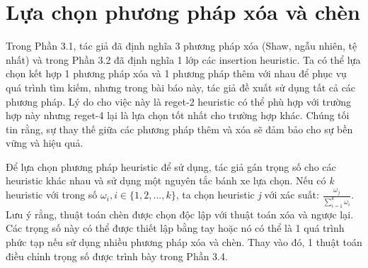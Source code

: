 \section{Lựa chọn phương pháp xóa và chèn}
Trong Phần 3.1, tác giả đã định nghĩa 3 phương pháp xóa (Shaw, ngẫu nhiên, tệ nhất) và trong Phần 3.2 đã định nghĩa 1 lớp các insertion heuristic. Ta có thể lựa chọn kết hợp 1 phương pháp xóa và 1 phương pháp thêm với nhau để phục vụ quá trình tìm kiếm, nhưng trong bài báo này, tác giả đề xuất sử dụng tất cả các phương pháp. Lý do cho việc này là reget-2 heuristic có thể phù hợp với trường hợp này nhưng reget-4 lại là lựa chọn tốt nhất cho trường hợp khác. Chúng tối tin rằng, sự thay thế giữa các phương pháp thêm và xóa sẽ đảm bảo cho sự bền vững và hiệu quả.

Để lựa chọn phương pháp heuristic để sử dụng, tác giả gán trọng số cho các heuristic khác nhau và sử dụng một nguyên tắc bánh xe lựa chọn. Nếu có \textit{k} heuristic với trong số $\omega_i, i \in \{1,2,...,k\}$, ta chọn heuristic \textit{j} với xác suất: $\frac{\omega_j}{\sum_{i=1}^k \omega_i}$. Lưu ý rằng, thuật toán chèn được chọn độc lập với thuật toán xóa và ngược lại. Các trọng số này có thể được thiết lập bằng tay hoặc nó có thể là 1 quá trình phức tạp nếu sử dụng nhiều phương pháp xóa và chèn. Thay vào đó, 1 thuật toán điều chỉnh trọng số được trình bày trong Phần 3.4.
